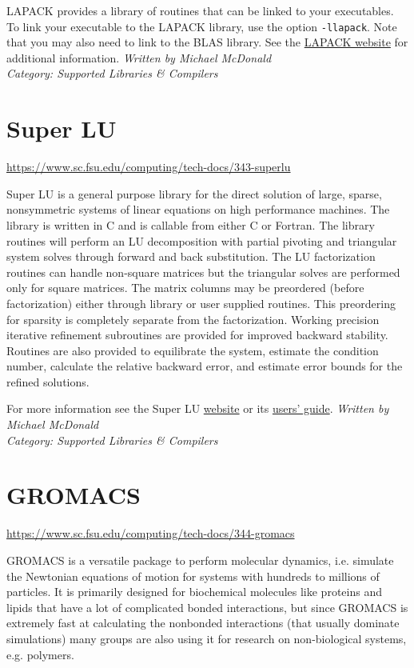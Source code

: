 \documentclass[12pt,a4paper]{article}
\begin{document}
LAPACK provides a library of routines that can be linked to your executables. To link your executable to the LAPACK library, use the option \texttt{-llapack}. Note that you may also need to link to the BLAS library. See the \href{http://www.netlib.org/lapack/}{LAPACK website} for additional information.
\hfill \textit{Written by Michael McDonald} \\
\hfill \textit{Category: Supported Libraries \& Compilers}

\section{Super LU}
\url{https://www.sc.fsu.edu/computing/tech-docs/343-superlu}

Super LU is a general purpose library for the direct solution of large,
sparse, nonsymmetric systems of linear equations on high performance
machines. The library is written in C and is callable from either C or
Fortran. The library routines will perform an LU decomposition with
partial pivoting and triangular system solves through forward and back
substitution. The LU factorization routines can handle non-square
matrices but the triangular solves are performed only for square
matrices. The matrix columns may be preordered (before factorization)
either through library or user supplied routines. This preordering for
sparsity is completely separate from the factorization. Working
precision iterative refinement subroutines are provided for improved
backward stability. Routines are also provided to equilibrate the
system, estimate the condition number, calculate the relative backward
error, and estimate error bounds for the refined solutions.

For more information see the Super LU \href{https://portal.nersc.gov/project/sparse/superlu/}{website} or its \href{https://portal.nersc.gov/project/sparse/superlu/superlu_ug.pdf}{users' guide}.
\hfill \textit{Written by Michael McDonald} \\
\hfill \textit{Category: Supported Libraries \& Compilers}

\section{GROMACS}
\url{https://www.sc.fsu.edu/computing/tech-docs/344-gromacs}

GROMACS is a versatile package to perform molecular dynamics, i.e. simulate the Newtonian equations of motion for systems with hundreds to millions of particles. It is primarily designed for biochemical molecules like proteins and lipids that have a lot of complicated bonded interactions, but since GROMACS is extremely fast at calculating the nonbonded interactions (that usually dominate simulations) many groups are also using it for research on non-biological systems, e.g. polymers.
\end{document}
